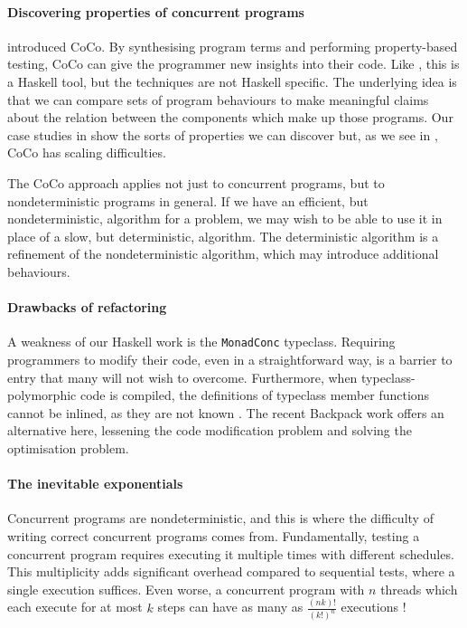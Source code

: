 \paragraph{Discovering properties of concurrent programs}
 introduced CoCo.  By synthesising program terms and
performing property-based testing, CoCo can give the programmer new
insights into their code.  Like \dejafu{}, this is a Haskell tool, but
the techniques are not Haskell specific.  The underlying idea is that
we can compare sets of program behaviours to make meaningful claims
about the relation between the components which make up those
programs.  Our case studies in  show the sorts of
properties we can discover but, as we see in
, CoCo has scaling difficulties.

The CoCo approach applies not just to concurrent programs, but to
nondeterministic programs in general.  If we have an efficient, but
nondeterministic, algorithm for a problem, we may wish to be able to
use it in place of a slow, but deterministic, algorithm.  The
deterministic algorithm is a refinement of the nondeterministic
algorithm, which may introduce additional behaviours.

\paragraph{Drawbacks of refactoring}
A weakness of our Haskell work is the \verb|MonadConc| typeclass.
Requiring programmers to modify their code, even in a straightforward
way, is a barrier to entry that many will not wish to overcome.
Furthermore, when typeclass-polymorphic code is compiled, the
definitions of typeclass member functions cannot be inlined, as they
are not known \parencite{peytonjones2002}.  The recent Backpack
work \parencite{yang2017} offers an alternative here, lessening the code
modification problem and solving the optimisation problem.

\paragraph{The inevitable exponentials}
Concurrent programs are nondeterministic, and this is where the
difficulty of writing correct concurrent programs comes from.
Fundamentally, testing a concurrent program requires executing it
multiple times with different schedules.  This multiplicity adds
significant overhead compared to sequential tests, where a single
execution suffices.  Even worse, a concurrent program with $n$ threads
which each execute for at most $k$ steps can have as many as
$\frac{(nk)!}{(k!)^{n}}$ executions \parencite{musuvathi2007}!


